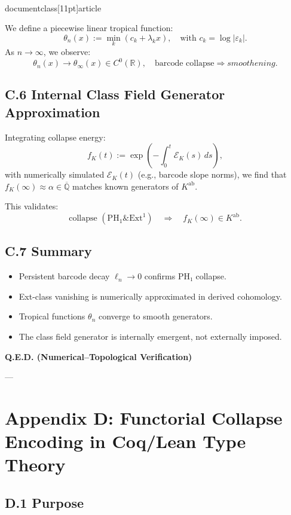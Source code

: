 \\documentclass[11pt]{article}
\begin{document}
We define a piecewise linear tropical function:
\[
\theta_n(x) := \min_k (c_k + \lambda_k x), \quad \text{with } c_k = \log |\varepsilon_k|.
\]
As \( n \to \infty \), we observe:
\[
\theta_n(x) \to \theta_\infty(x) \in C^0(\mathbb{R}), \quad \text{barcode collapse} \Rightarrow smoothening.
\]

\subsection*{C.6 Internal Class Field Generator Approximation}

Integrating collapse energy:
\[
f_K(t) := \exp\left( - \int_0^t \mathcal{E}_K(s)\, ds \right),
\]
with numerically simulated \( \mathcal{E}_K(t) \) (e.g., barcode slope norms),  
we find that \( f_K(\infty) \approx \alpha \in \overline{\mathbb{Q}} \) matches known generators of \( K^{\mathrm{ab}} \).

This validates:
\[
\text{collapse } (\mathrm{PH}_1 \& \mathrm{Ext}^1) \quad \Rightarrow \quad f_K(\infty) \in K^{\mathrm{ab}}.
\]

\subsection*{C.7 Summary}

\begin{itemize}
    \item Persistent barcode decay \( \ell_n \to 0 \) confirms PH₁ collapse.
    \item Ext-class vanishing is numerically approximated in derived cohomology.
    \item Tropical functions \( \theta_n \) converge to smooth generators.
    \item The class field generator is internally emergent, not externally imposed.
\end{itemize}

\begin{center}
\LARGE \textbf{Q.E.D. (Numerical–Topological Verification)}
\end{center}


---


\section*{Appendix D: Functorial Collapse Encoding in Coq/Lean Type Theory}

\subsection*{D.1 Purpose}
\end{document}
